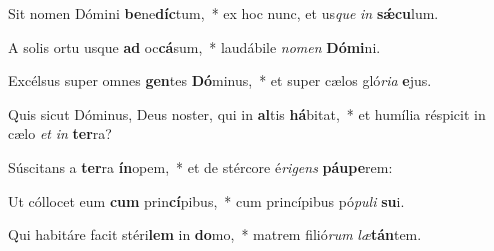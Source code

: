 \item Sit nomen Dómini \textbf{be}ne\textbf{díc}tum,~* ex hoc nunc, et us\textit{que} \textit{in} \textbf{sǽ}\textbf{cu}lum.
\item A solis ortu usque \textbf{ad} oc\textbf{cá}sum,~* laudábile \textit{no}\textit{men} \textbf{Dó}\textbf{mi}ni.
\item Excélsus super omnes \textbf{gen}tes \textbf{Dó}minus,~* et super cælos gló\textit{ri}\textit{a} \textbf{e}jus.
\item Quis sicut Dóminus, Deus noster, qui in \textbf{al}tis \textbf{há}bitat,~* et humília réspicit in cælo \textit{et} \textit{in} \textbf{ter}ra?
\item Súscitans a \textbf{ter}ra \textbf{ín}opem,~* et de stércore é\textit{ri}\textit{gens} \textbf{páu}\textbf{pe}rem:
\item Ut cóllocet eum \textbf{cum} prin\textbf{cí}pibus,~* cum princípibus pó\textit{pu}\textit{li} \textbf{su}i.
\item Qui habitáre facit stéri\textbf{lem} in \textbf{do}mo,~* matrem filió\textit{rum} \textit{læ}\textbf{tán}tem.
